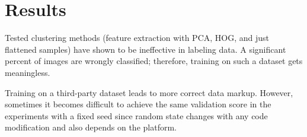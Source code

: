 \documentclass{article}
\begin{document}
\section{Results}

Tested clustering methods (feature extraction with PCA, HOG, and just flattened
samples) have shown to be ineffective in labeling data. A significant percent
of images are wrongly classified; therefore, training on such a dataset gets
meaningless.

Training on a third-party dataset leads to more correct data markup. However,
sometimes it becomes difficult to achieve the same validation score in the experiments
with a fixed seed since random state changes with any code modification and also
depends on the platform.
\end{document}
